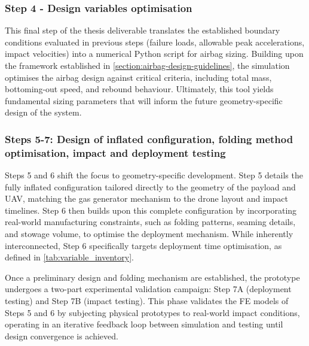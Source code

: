 \subsubsection{Step 4 - Design variables optimisation}
This final step of the thesis deliverable translates the established boundary conditions evaluated in previous steps (failure loads, allowable peak accelerations, impact velocities) into a numerical Python script for airbag sizing. Building upon the framework established in \cref{section:airbag-design-guidelines}, the simulation optimises the airbag design against critical criteria, including total mass, bottoming-out speed, and rebound behaviour. Ultimately, this tool yields fundamental sizing parameters that will inform the future geometry-specific design of the system.


\subsubsection{Steps 5-7: Design of inflated configuration, folding method optimisation, impact and deployment testing}
Steps 5 and 6 shift the focus to geometry-specific development. Step 5 details the fully inflated configuration tailored directly to the geometry of the payload and UAV, matching the gas generator mechanism to the drone layout and impact timelines. Step 6 then builds upon this complete configuration by incorporating real-world manufacturing constraints, such as folding patterns, seaming details, and stowage volume, to optimise the deployment mechanism. While inherently interconnected, Step 6 specifically targets deployment time optimisation, as defined in \cref{tab:variable_inventory}.

Once a preliminary design and folding mechanism are established, the prototype undergoes a two-part experimental validation campaign: Step 7A (deployment testing) and Step 7B (impact testing). This phase validates the FE models of Steps 5 and 6 by subjecting physical prototypes to real-world impact conditions, operating in an iterative feedback loop between simulation and testing until design convergence is achieved.
